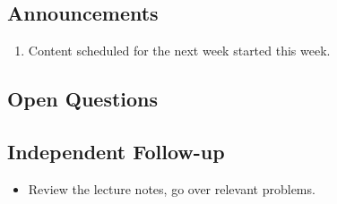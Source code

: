 \subsection*{Announcements}
\begin{enumerate}
    \item Content scheduled for the next week started this week. 
\end{enumerate}

\subsection*{Open Questions}


\subsection*{Independent Follow-up}
\begin{itemize}
    \item Review the lecture notes, go over relevant problems.
\end{itemize}
